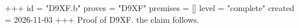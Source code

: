 +++
id = "D9XF.b"
proves = "D9XF"
premises = []
level = "complete"
created = 2026-11-03
+++
Proof of D9XF. the claim follows.
